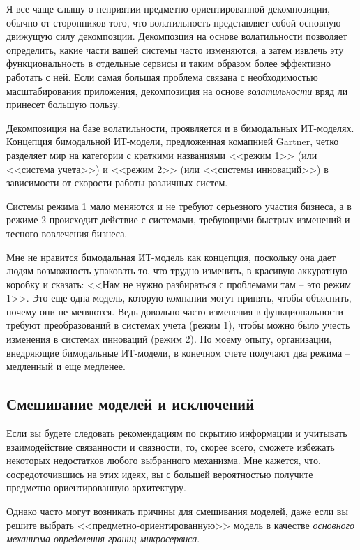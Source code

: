 \documentclass[%
	11pt,
	a4paper,
	utf8,
		]{article}
\begin{document}
Я все чаще слышу о неприятии предметно-ориентированной декомпозиции, обычно от сторонников того, что волатильность представляет собой основную движущую силу декомпозции. Декомпозция на основе волатильности позволяет определить, какие части вашей системы часто изменяются, а затем извлечь эту функциональность в отдельные сервисы и таким образом более эффективно работать с ней. {\color{red}Если самая большая проблема связана с необходимостью масштабирования приложения, декомпозиция на основе \emph{волатильности} вряд ли принесет большую пользу.}

Декомпозиция на базе волатильности, проявляется и в бимодальных ИТ-моделях. Концепция бимодальной ИТ-модели, предложенная комапнией Gartner, четко разделяет мир на категории с краткими названиями <<режим 1>> (или <<система учета>>) и <<режим 2>> (или <<системы инноваций>>) в зависимости от скорости работы различных систем. 

Системы режима 1 мало меняются и не требуют серьезного участия бизнеса, а в режиме 2 происходит действие с системами, требующими быстрых изменений и тесного вовлечения бизнеса.

Мне не нравится бимодальная ИТ-модель как концепция, поскольку она дает людям возможность упаковать то, что трудно изменить, в красивую аккуратную коробку и сказать: <<Нам не нужно разбираться с проблемами там -- это режим 1>>. Это еще одна модель, которую компании могут принять, чтобы объяснить, почему они не меняются. Ведь довольно часто изменения в функциональности требуют преобразований в системах учета (режим 1), чтобы можно было учесть изменения в системах инноваций (режим 2). По моему опыту, организации, внедряющие бимодальные ИТ-модели, в конечном счете получают два режима -- медленный и еще медленее.

\subsection{Смешивание моделей и исключений}

Если вы будете следовать рекомендациям по скрытию информации и учитывать взаимодействие связанности и связности, то, скорее всего, сможете избежать некоторых недостатков любого выбранного механизма. Мне кажется, что, сосредоточившись на этих идеях, вы с большей вероятностью получите предметно-ориентированную архитектуру. 

Однако часто могут возникать причины для смешивания моделей, даже если вы решите выбрать <<предметно-ориентированную>> модель в качестве \emph{основного механизма определения границ микросервиса}.
\end{document}
